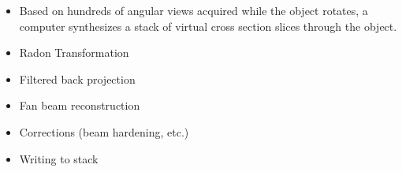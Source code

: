 \begin{frame}[allowframebreaks]

	\begin{itemize}
		\item Based on hundreds of angular views acquired while the object rotates, a computer synthesizes a stack of virtual cross section slices through the object.
		\item Radon Transformation
		\item Filtered back projection
		\item Fan beam reconstruction
		\item Corrections (beam hardening, etc.)
		\item Writing to stack
	\end{itemize}
\end{frame}

